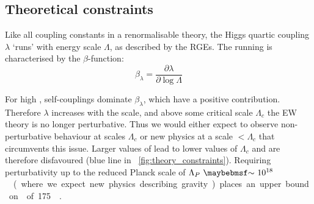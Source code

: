 


\subsection{Theoretical constraints}
\label{sec:prior_constraints:theory}

Like all coupling constants in a renormalisable theory, the Higgs quartic coupling 
$\lambda$ `runs' with energy scale $\Lambda$, as described by the \acp{RGE}. The running 
is characterised by the $\beta$-function:
\begin{equation*}
	\beta_{\lambda} = \frac{\partial \lambda}{\partial \log\Lambda}
\end{equation*}

For high \mH, self-couplings dominate $\beta_{\lambda}$, which have a
positive contribution. Therefore $\lambda$ increases with the scale, and above some 
critical scale $\Lambda_c$ the \ac{EW} theory is no longer perturbative. Thus we would 
either expect to observe non-perturbative behaviour at scales \about$\Lambda_c$ or new 
physics at a scale $<\Lambda_c$ that circumvents this issue. Larger values of \mH lead to 
lower values of $\Lambda_c$ and are therefore disfavoured (blue line in 
\Figure~\ref{fig:theory_constraints}). Requiring perturbativity up to the 
reduced Planck scale of \unit{$\Lambda_{P}~\about~10^{18}$}{\GeV} (where we expect new 
physics describing gravity) places an upper bound on \mH of \unit{175}{\GeV} 
\cite{Ellis:2009}.


